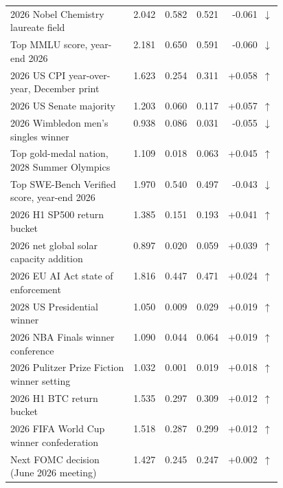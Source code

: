 \begin{longtable}{p{0.46\linewidth} r r r r}
2026 Nobel Chemistry laureate field & 2.042 & 0.582 & 0.521 & -0.061~$\downarrow$ \\
Top MMLU score, year-end 2026 & 2.181 & 0.650 & 0.591 & -0.060~$\downarrow$ \\
2026 US CPI year-over-year, December print & 1.623 & 0.254 & 0.311 & +0.058~$\uparrow$ \\
2026 US Senate majority & 1.203 & 0.060 & 0.117 & +0.057~$\uparrow$ \\
2026 Wimbledon men's singles winner & 0.938 & 0.086 & 0.031 & -0.055~$\downarrow$ \\
Top gold-medal nation, 2028 Summer Olympics & 1.109 & 0.018 & 0.063 & +0.045~$\uparrow$ \\
Top SWE-Bench Verified score, year-end 2026 & 1.970 & 0.540 & 0.497 & -0.043~$\downarrow$ \\
2026 H1 SP500 return bucket & 1.385 & 0.151 & 0.193 & +0.041~$\uparrow$ \\
2026 net global solar capacity addition & 0.897 & 0.020 & 0.059 & +0.039~$\uparrow$ \\
2026 EU AI Act state of enforcement & 1.816 & 0.447 & 0.471 & +0.024~$\uparrow$ \\
2028 US Presidential winner & 1.050 & 0.009 & 0.029 & +0.019~$\uparrow$ \\
2026 NBA Finals winner conference & 1.090 & 0.044 & 0.064 & +0.019~$\uparrow$ \\
2026 Pulitzer Prize Fiction winner setting & 1.032 & 0.001 & 0.019 & +0.018~$\uparrow$ \\
2026 H1 BTC return bucket & 1.535 & 0.297 & 0.309 & +0.012~$\uparrow$ \\
2026 FIFA World Cup winner confederation & 1.518 & 0.287 & 0.299 & +0.012~$\uparrow$ \\
Next FOMC decision (June 2026 meeting) & 1.427 & 0.245 & 0.247 & +0.002~$\uparrow$ \\
\end{longtable}